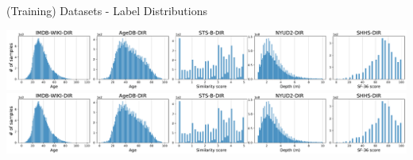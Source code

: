 \begin{frame}{(Training) Datasets - Label Distributions}
	\begin{center}
		\includegraphics[trim={0 0 52em 0},clip,scale=0.4]{images/dataset_info.pdf}
		\includegraphics[trim={78.8em 0 0 0},clip,scale=0.4]{images/dataset_info.pdf}
	\end{center}
\end{frame}